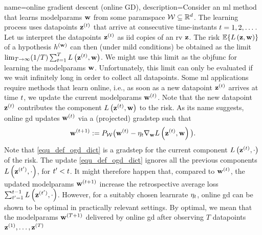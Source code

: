 {name={online gradient descent (online GD)}, 
	description={Consider  an \gls{ml} method that learns \gls{modelparams} 
		${\bf w}$ from some \gls{paramspace} $\mathcal{W} \subseteq \mathbb{R}^{d}$. 
		The learning process uses \glspl{datapoint} ${\bf z}^{(t)}$ that arrive at consecutive time-instants $t=1, 2, \dots$. 
		Let us interpret the \glspl{datapoint} ${\bf z}^{(t)}$ as \gls{iid} copies 
		of an \gls{rv} ${\bf z}$. The \gls{risk} $\mathbb{E}\{ L\left({\bf z},{\bf w} \right) \}$ of a 
		\gls{hypothesis} $h^{({\bf w})}$ can then (under mild conditions) be obtained as the limit 
		$\lim_{T\rightarrow \infty} (1/T)\sum_{t=1}^{T} L\left({\bf z}^{(t)},{\bf w} \right)$. 
		We might use this limit as the \gls{objfunc} for learning the \gls{modelparams} ${\bf w}$. 
		Unfortunately, this limit can only be evaluated if we wait infinitely long in order to collect all \glspl{datapoint}. 
		Some \gls{ml} applications require methods that learn online, i.e., as soon as a new \gls{datapoint} ${\bf z}^{(t)}$ 
		arrives at time $t$, we update the current \gls{modelparams} ${\bf w}^{(t)}$. Note that 
		the new \gls{datapoint} ${\bf z}^{(t)}$ contributes the component $L\left({\bf z}^{(t)},{\bf w} \right)$ 
		to the \gls{risk}. As its name suggests, online \gls{gd} updates ${\bf w}^{(t)}$ via a (projected) \gls{gradstep} such that
		\begin{equation} 
			\label{equ_def_ogd_dict}
 			{\bf w}^{(t+1)} := P_{\mathcal{W}}\big( {\bf w}^{(t)} - \eta_{t} \nabla_{{\bf w}} L\left({\bf z}^{(t)},{\bf w} \right)\big). 
		\end{equation} 
		Note that \eqref{equ_def_ogd_dict} is a \gls{gradstep} for the current component $L\left({\bf z}^{(t)},\cdot \right)$ 
		of the \gls{risk}. The update \eqref{equ_def_ogd_dict} ignores all the previous components $L\left({\bf z}^{(t')},\cdot \right)$, 
		for $t' < t$. It might therefore happen that, compared to ${\bf w}^{(t)}$, the updated \gls{modelparams} 
		${\bf w}^{(t+1)}$ increase the retrospective average \gls{loss} $\sum_{t'=1}^{t-1} L\left({\bf z}^{(t')},\cdot \right)$. 
		However, for a suitably chosen \gls{learnrate} $\eta_{t}$, online \gls{gd} can be shown 
		to be optimal in practically relevant settings. By optimal, we mean that the \gls{modelparams} 
		${\bf w}^{(T+1)}$ delivered by online \gls{gd} after observing $T$ \glspl{datapoint} ${\bf z}^{(1)}, \ldots, {\bf z}^{(T)}$ 
}}
